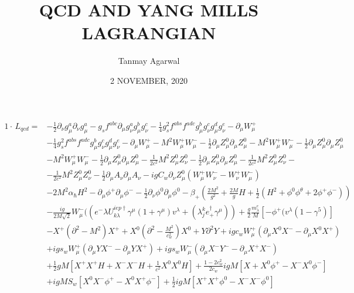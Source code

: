 \documentclass{article}
\begin{document}
\title{QCD AND YANG MILLS LAGRANGIAN}
\author{Tanmay Agarwal} 
\date{2 NOVEMBER, 2020}
\maketitle

\begin{equation*}
\begin{split}
1\cdot \, L_{qcd} =&-\frac{1}{2} \partial_{\nu}g^a_{\mu} \partial_\nu g^a_\mu - g_s f^{abc}\partial_\mu g^a_\nu g^b_\mu g^c_\nu - \frac{1}{4} g^2_s f^{abs}f^{adc} g^b_\mu g^c_\nu g^d_\mu g^e_\nu - \partial_\mu W^+_\mu  \\
               &- \frac{1}{4} g^2_s f^{abs}f^{adc} g^b_\mu g^c_\nu g^d_\mu g^e_\nu - \partial_\mu W^+_\mu- M^2 W^+_\mu  W^-_\mu - \frac{1}{2}\partial_\mu Z^0_\mu \partial_\mu Z^0_\mu - M^2 W^+_\mu  W^-_\mu - \frac{1}{2}\partial_\mu Z^0_\mu \partial_\mu Z^0_\mu \\
               &- M^2 W^+_\mu  W^-_\mu - \frac{1}{2}\partial_\mu Z^0_\mu \partial_\mu Z^0_\mu - \frac{1}{2c^2} M^2 Z^0_\mu Z^0_\nu -  \frac{1}{2}\partial_\mu Z^0_\mu \partial_\mu Z^0_\mu -\frac{1}{2c^2} M^2 Z^0_\mu Z^0_\nu -  \\
              &-\frac{1}{2c^2} M^2 Z^0_\mu Z^0_\nu - \frac{1}{2} \partial_\mu A_\nu \partial_\mu A_\nu -igC_w \partial_\nu Z^0_\mu( W^+_\mu W^-_\nu - W^+_\nu W^-_\mu) \\
              &- 2M^2 \alpha_\hbar H^2 - \partial_\mu \phi^+ \partial_\mu \phi^- -\frac{1}{2} \partial_\nu \phi^0 \partial_\mu \phi^0 - \beta_+ (\frac{2M^2}{g^2} + \frac{2M}{g}H+ \frac{1}{2}(H^2+\phi^0 \phi^\theta + 2\phi^+ \phi^-))\\
              &-\frac{ig}{2M\sqrt{2}}W^-_\mu ((e^-\lambda U^{iep\dagger}_{k\lambda} \gamma^\mu (1+\gamma^\mu) v^\lambda + (\lambda^k_j e^\dagger_+ \gamma^\mu))+ \frac{g}{2} \frac{m^e_\lambda}{M} [-\phi^+(v^\lambda(1-\gamma^5)]\\
              & -X^+ (\partial^2 - M^2)X^+ + X^0(\partial^2 - \frac{M^2}{c^2_w})X^0 + Y\partial^2 Y + igc_w W^+_\mu (\partial_\mu X^0 X^- - \partial_\mu X^0 X^+) \\
              & + igs_w W^+_\mu (\partial_\mu Y X^- -  \partial_\mu Y X^+) + igs_w W^-_\mu(\partial_\mu X^- Y^- - \partial_\mu X^+ X^- ) \\
              &+ \frac{1}{2} gM[X^+ X^+ H + X^- X^- H + \frac{1}{c^2} X^0 X^0 H] + \frac{1-2c^2_w}{2c_w}igM[X+ X^0 \phi^+ - X^- X^0 \phi^-] \\
              & + igMS_w[X^0 X^- \phi^+ - X^0 X^+ \phi^-] + \frac{1}{2}igM[X^+ X^+ \phi^0 - X^- X^- \phi^0] 
\end{split}                
\end{equation*}
\\
\end{document}
